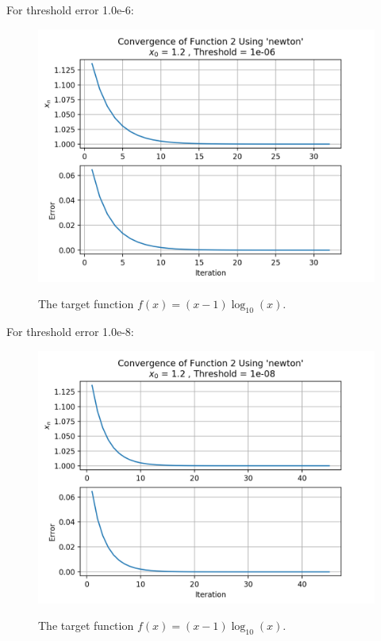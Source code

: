 \documentclass[12pt]{article}
\begin{document}
	\newpage
	For threshold  error 1.0e-6:
		\begin{figure}[h]
		\caption{The target function $f(x) = (x-1)\log_{10}(x)$.}
		\centering
		\includegraphics[width=1.0\textwidth]{./figures/initial_condition_1/result_2_1e-06.png}
		\label{fig:plot2dot3}
	\end{figure}
	
	\newpage
	For threshold  error 1.0e-8:
		\begin{figure}[h]
		\caption{The target function $f(x) = (x-1)\log_{10}(x)$.}
		\centering
		\includegraphics[width=1.0\textwidth]{./figures/initial_condition_1/result_2_1e-08.png}
		\label{fig:plot2dot3}
	\end{figure}
\end{document}
